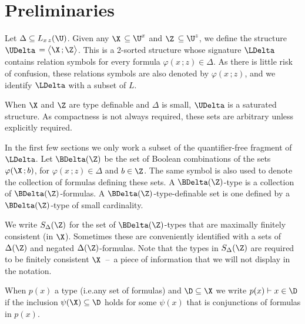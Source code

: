 \section{Preliminaries}
\label{preliminaries}

\def\ceq#1#2#3{\noindent\parbox[t]{15ex}{$\displaystyle #1$}\parbox{6ex}{\hfil $#2$}{$\displaystyle #3$}}


Let $\Delta\subseteq L_{x\,z}(\U)$.
Given any \emph{$\X$\/} $\subseteq\U^x$ and \emph{$\Z$\/} $\subseteq\U^z$, we define the structure \emph{$\UDelta$\/} $=\big\langle\X\,;\Z\big\rangle$.
This is a 2-sorted structure whose signature \emph{$\LDelta$\/} contains relation symbols for every formula $\varphi(x\,;z)\in\Delta$.
As there is little risk of confusion, these relations symbols are also denoted by $\varphi(x\,;z)$, and we identify $\LDelta$ with a subset of $L$.

When $\X$ and $\Z$ are type definable and $\Delta$ is small, $\UDelta$ is a saturated structure.
As compactness is not always required, these sets are arbitrary unless explicitly required.

In the first few sections we only work a subset of the quantifier-free fragment of $\LDelta$.
Let $\BDelta(\Z)$ be the set of Boolean combinations of the sets $\varphi(\X\,;b)$, for $\varphi(x\,;z)\in\Delta$ and $b\in\Z$.
The same symbol is also used to denote the collection of formulas defining these sets.
A $\BDelta(\Z)$-type is a collection of $\BDelta(\Z)$-formulas.
A $\BDelta(\Z)$-type-definable set is one defined by a $\BDelta(\Z)$-type of small cardinality.

We write \emph{$S_\Delta(\Z)$\/} for the set of $\BDelta(\Z)$-types that are maximally finitely consistent (in $\X$).
Sometimes these are conveniently identified with a sets of $\Delta(\Z)$ and negated $\Delta(\Z)$-for\-mulas.
Note that the types in $S_\Delta(\Z)$ are required to be finitely consistent $\X$~--~a piece of information that we will not display in the notation.


When $p(x)$ a type (i.e.\@ any set of formulas) and $\D\subseteq\X$ we write $p(x)\vdash x\in\D$ if the inclusion $\psi(\X)\subseteq\D$ holds for some $\psi(x)$ that is conjunctions of formulas in $p(x)$.

